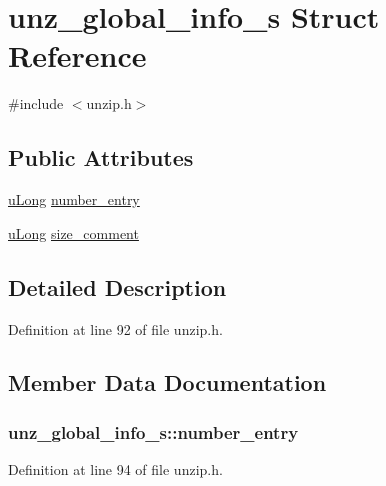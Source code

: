 \hypertarget{structunz__global__info__s}{\section{unz\-\_\-global\-\_\-info\-\_\-s Struct Reference}
\label{structunz__global__info__s}
}


{\ttfamily \#include $<$unzip.\-h$>$}

\subsection*{Public Attributes}
\begin{DoxyCompactItemize}
\item 
\hyperlink{zconf_8h_a154b3b80120c903a368fec5f11f3007a}{u\-Long} \hyperlink{structunz__global__info__s_a827d1cd1d09f12acd6c2ee12494cb320}{number\-\_\-entry}
\item 
\hyperlink{zconf_8h_a154b3b80120c903a368fec5f11f3007a}{u\-Long} \hyperlink{structunz__global__info__s_a10b58ab57b62301de813ecac0e974363}{size\-\_\-comment}
\end{DoxyCompactItemize}


\subsection{Detailed Description}


Definition at line 92 of file unzip.\-h.



\subsection{Member Data Documentation}
\hypertarget{structunz__global__info__s_a827d1cd1d09f12acd6c2ee12494cb320}{
\subsubsection[{number\-\_\-entry}]{ unz\-\_\-global\-\_\-info\-\_\-s\-::number\-\_\-entry}}\label{structunz__global__info__s_a827d1cd1d09f12acd6c2ee12494cb320}


Definition at line 94 of file unzip.\-h.

